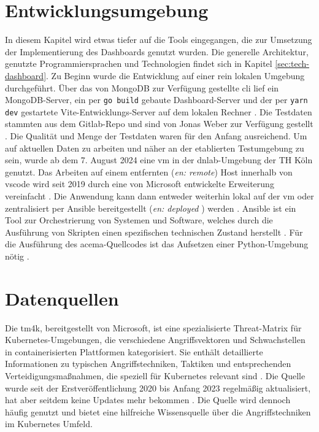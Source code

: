 \section{Entwicklungsumgebung}
\label{sec:Entwicklungsumgebung}
In diesem Kapitel wird etwas tiefer auf die Tools eingegangen, die zur Umsetzung der Implementierung des Dashboards genutzt wurden. Die generelle Architektur, genutzte Programmiersprachen und Technologien findet sich in Kapitel \ref{sec:tech-dashboard}. Zu Beginn wurde die Entwicklung auf einer rein lokalen Umgebung durchgeführt. Über das von MongoDB zur Verfügung gestellte \gls{cli} lief ein MongoDB-Server, ein per \verb|go build| gebaute Dashboard-Server und der per \verb|yarn dev| gestartete Vite-Entwicklungs-Server auf dem lokalen Rechner \autocite{MongoDBDeveloperData} \autocite{Vite}. Die Testdaten stammten aus dem Gitlab-Repo und sind von Jonas Weber zur Verfügung gestellt \autocite{AddExampleData2023}. Die Qualität und Menge der Testdaten waren für den Anfang ausreichend. Um auf aktuellen Daten zu arbeiten und näher an der etablierten Testumgebung zu sein, wurde ab dem 7. August 2024 eine \gls{vm} in der \glqq\gls{dnlab}\grqq-Umgebung der TH Köln genutzt. Das Arbeiten auf einem entfernten (\textit{en: remote}) Host innerhalb von \gls{vscode} wird seit 2019 durch eine von Microsoft entwickelte Erweiterung vereinfacht \autocite{RemoteSSHVisual}. Die Anwendung kann dann entweder weiterhin lokal auf der \gls{vm} oder zentralisiert per Ansible bereitgestellt (\textit{en: deployed} ) werden \autocite{HomepageAnsibleCollaborative}. Ansible ist ein Tool zur Orchestrierung von Systemen und Software, welches durch die Ausführung von Skripten einen spezifischen technischen Zustand herstellt \autocite{ansiblecollaborativeetalHowAnsibleWorks2024}. Für die Ausführung des \gls{acema}-Quellcodes ist das Aufsetzen einer Python-Umgebung nötig \autocite{FklementAcema_oranCode} \autocite{WelcomePythonorg}.

\section{Datenquellen}
\label{sec:datenquellen}
\par Die \gls{tm4k}, bereitgestellt von Microsoft, ist eine spezialisierte Threat-Matrix für Kubernetes-Umgebungen, die verschiedene Angriffsvektoren und Schwachstellen in containerisierten Plattformen kategorisiert. Sie enthält detaillierte Informationen zu typischen Angriffstechniken, Taktiken und entsprechenden Verteidigungsmaßnahmen, die speziell für Kubernetes relevant sind \autocite{TacticsThreatMatrix}. Die Quelle wurde seit der Erstveröffentlichung 2020 bis Anfang 2023 regelmäßig aktualisiert, hat aber seitdem keine Updates mehr bekommen \autocite{DeploymentsMicrosoftThreatMatrixforKubernetes}. Die Quelle wird dennoch häufig genutzt und bietet eine hilfreiche Wissensquelle über die Angriffstechniken im Kubernetes Umfeld.

